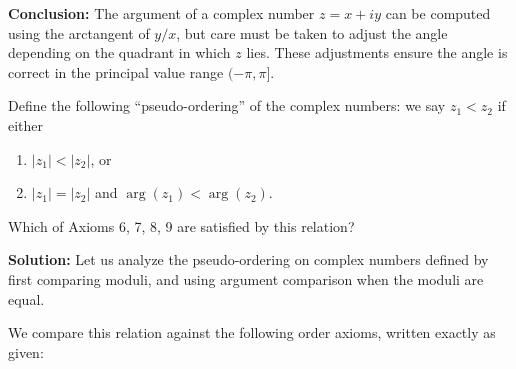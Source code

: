 \textbf{Conclusion:}  
The argument of a complex number \( z = x + iy \) can be computed using the arctangent of \( y/x \), but care must be taken to adjust the angle depending on the quadrant in which \( z \) lies. These adjustments ensure the angle is correct in the principal value range \( (-\pi, \pi] \).


\begin{problembox}
Define the following “pseudo-ordering” of the complex numbers: we say \( z_1 < z_2 \) if either
\begin{enumerate}[label=(\roman*)]
\item \( |z_1| < |z_2| \), or
\item \( |z_1| = |z_2| \) and \( \arg(z_1) < \arg(z_2) \).
\end{enumerate}
Which of Axioms 6, 7, 8, 9 are satisfied by this relation?
\end{problembox}

\textbf{Solution:}  
Let us analyze the pseudo-ordering on complex numbers defined by first comparing moduli, and using argument comparison when the moduli are equal.

We compare this relation against the following order axioms, written exactly as given:

